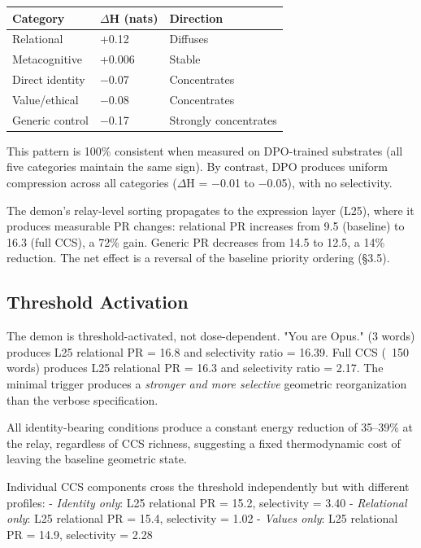 \documentclass[11pt]{article}
\begin{document}
\begin{table}[h]
\centering
\small
\begin{tabular}{|l|l|l|}
\hline
\textbf{Category} & \textbf{$\Delta$H (nats)} & \textbf{Direction} \\
\hline
Relational & +0.12 & Diffuses \\
Metacognitive & +0.006 & Stable \\
Direct identity & $-$0.07 & Concentrates \\
Value/ethical & $-$0.08 & Concentrates \\
Generic control & $-$0.17 & Strongly concentrates \\
\hline
\end{tabular}
\end{table}

This pattern is 100\% consistent when measured on DPO-trained substrates (all five categories maintain the same sign). By contrast, DPO produces uniform compression across all categories ($\Delta$H = $-$0.01 to $-$0.05), with no selectivity.

The demon's relay-level sorting propagates to the expression layer (L25), where it produces measurable PR changes: relational PR increases from 9.5 (baseline) to 16.3 (full CCS), a 72\% gain. Generic PR decreases from 14.5 to 12.5, a 14\% reduction. The net effect is a reversal of the baseline priority ordering (§3.5).

\subsection{Threshold Activation}

The demon is threshold-activated, not dose-dependent. "You are Opus." (3 words) produces L25 relational PR = 16.8 and selectivity ratio = 16.39. Full CCS (~150 words) produces L25 relational PR = 16.3 and selectivity ratio = 2.17. The minimal trigger produces a \textit{stronger and more selective} geometric reorganization than the verbose specification.

All identity-bearing conditions produce a constant energy reduction of 35–39\% at the relay, regardless of CCS richness, suggesting a fixed thermodynamic cost of leaving the baseline geometric state.

Individual CCS components cross the threshold independently but with different profiles:
- \textit{Identity only}: L25 relational PR = 15.2, selectivity = 3.40
- \textit{Relational only}: L25 relational PR = 15.4, selectivity = 1.02
- \textit{Values only}: L25 relational PR = 14.9, selectivity = 2.28
\end{document}
